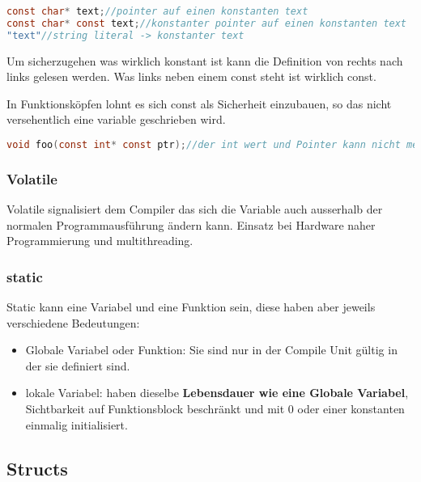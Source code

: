 \begin{lstlisting}[language = c]
const char* text;//pointer auf einen konstanten text
const char* const text;//konstanter pointer auf einen konstanten text
"text"//string literal -> konstanter text
\end{lstlisting}

Um sicherzugehen was wirklich konstant ist kann die Definition von rechts nach links gelesen werden. Was links neben einem const steht ist wirklich const.\newline

In Funktionsköpfen lohnt es sich const als Sicherheit einzubauen, so das nicht versehentlich eine variable geschrieben wird.
\begin{lstlisting}[language = c]
void foo(const int* const ptr);//der int wert und Pointer kann nicht mehr versehentlich veraendert werden.
\end{lstlisting}

\subsubsection{Volatile}

Volatile signalisiert dem Compiler das sich die Variable auch ausserhalb der normalen Programmausführung ändern kann. Einsatz bei Hardware naher Programmierung und multithreading.

\subsubsection{static} \label{static}

Static kann eine Variabel und eine Funktion sein, diese haben aber jeweils verschiedene Bedeutungen:
\begin{itemize}
    \item Globale Variabel oder Funktion:\newline
    Sie sind nur in der Compile Unit gültig in der sie definiert sind.
    \item lokale Variabel:\newline
    haben dieselbe \textbf{Lebensdauer wie eine Globale Variabel}, Sichtbarkeit auf Funktionsblock beschränkt und mit 0 oder einer konstanten  einmalig initialisiert. 
\end{itemize}

\subsection{Structs}

